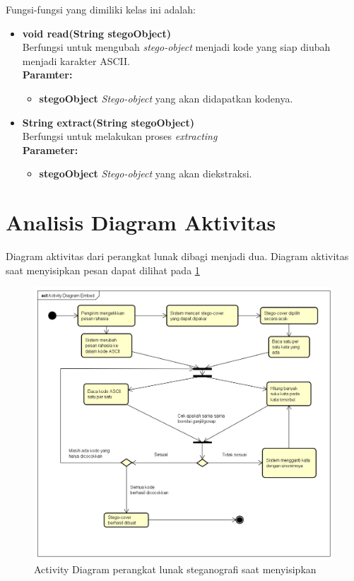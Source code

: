 \begin{enumerate}
	Fungsi-fungsi yang dimiliki kelas ini adalah:
	
	\begin{itemize}
		\item \textbf{void read(String stegoObject)}\\
		Berfungsi untuk mengubah \textit{stego-object} menjadi kode yang siap diubah menjadi karakter ASCII.\\
		\textbf{Paramter:}
		\begin{itemize}
			\item \textbf{stegoObject} \textit{Stego-object} yang akan didapatkan kodenya.
		\end{itemize}
		
		\item \textbf{String extract(String stegoObject)}\\
		Berfungsi untuk melakukan proses \textit{extracting}\\
		\textbf{Parameter:}
		\begin{itemize}
			\item \textbf{stegoObject} \textit{Stego-object} yang akan diekstraksi.
		\end{itemize}
	\end{itemize}
	
\end{enumerate}

\section{Analisis Diagram Aktivitas}

Diagram aktivitas dari perangkat lunak dibagi menjadi dua. Diagram aktivitas saat menyisipkan pesan dapat dilihat pada \ref{fig:4_activity-penyisipan}

\begin{figure}[H]
	\centering
	\includegraphics[scale=0.4]{Gambar/activity-penyisipan}
	\caption{Activity Diagram perangkat lunak steganografi saat menyisipkan} 
	\label{fig:4_activity-penyisipan}
\end{figure}

